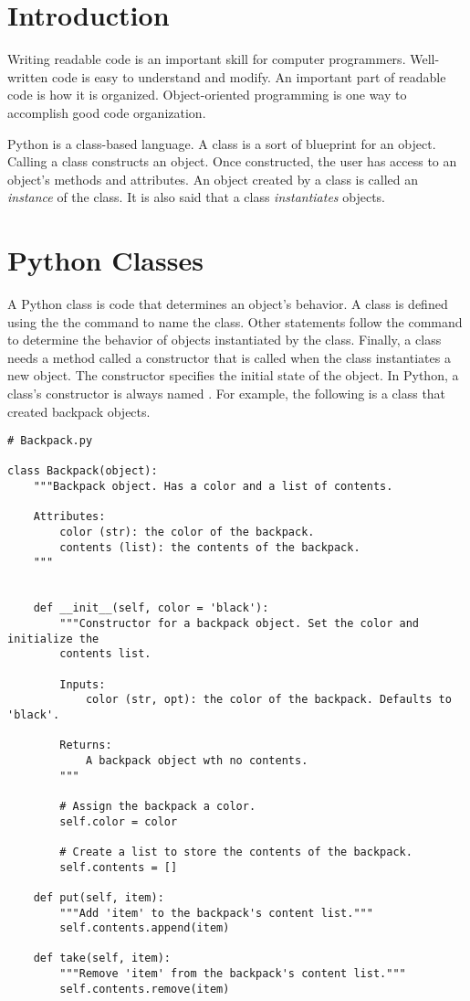 \label{lab:OOP}

\section*{Introduction}

Writing readable code is an important skill for computer programmers.
Well-written code is easy to understand and modify.
An important part of readable code is how it is organized.
Object-oriented programming is one way to accomplish good code organization.

Python is a class-based language.
A class is a sort of blueprint for an object.
Calling a class constructs an object.
Once constructed, the user has access to an object's methods and attributes.
An object created by a class is called an \emph{instance} of the class.
It is also said that a class \emph{instantiates} objects.

\section*{Python Classes}

A Python class is code that determines an object's behavior.
A class is defined using the the  command to name the class.
Other statements follow the  command to determine the behavior of objects instantiated by the class.
Finally, a class needs a method called a constructor that is called when the class instantiates a new object.
The constructor specifies the initial state of the object.
In Python, a class's constructor is always named .
For example, the following is a class that created backpack objects.

\begin{lstlisting}
# Backpack.py

class Backpack(object):
    """Backpack object. Has a color and a list of contents.
    
    Attributes:
        color (str): the color of the backpack.
        contents (list): the contents of the backpack.
    """
    
    
    def __init__(self, color = 'black'):
        """Constructor for a backpack object. Set the color and initialize the
        contents list.
        
        Inputs:
            color (str, opt): the color of the backpack. Defaults to 'black'.
        
        Returns:
            A backpack object wth no contents.
        """
        
        # Assign the backpack a color.
        self.color = color
        
        # Create a list to store the contents of the backpack.
        self.contents = []
    
    def put(self, item):
        """Add 'item' to the backpack's content list."""
        self.contents.append(item)
    
    def take(self, item):
        """Remove 'item' from the backpack's content list."""
        self.contents.remove(item)
\end{lstlisting}

